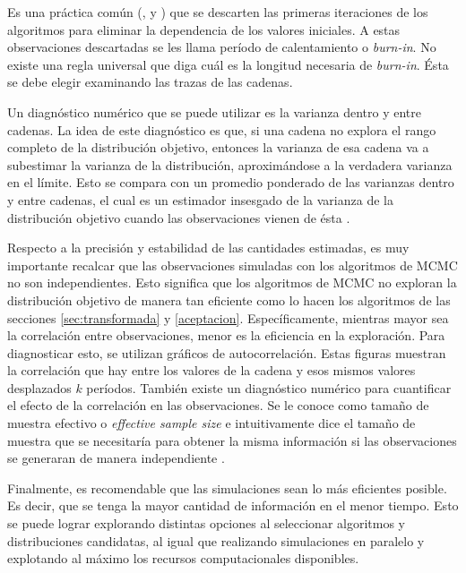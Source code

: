 \documentclass[11pt,a4paper]{article}
\begin{document}
Es una práctica común (\citet{kruschke}, \citet{gelman} y \citet{casella}) que se descarten las primeras iteraciones de los algoritmos para eliminar la dependencia de los valores iniciales. A estas observaciones descartadas se les llama período de calentamiento o \textit{burn-in}. No existe una regla universal que diga cuál es la longitud necesaria de \textit{burn-in}. Ésta se debe elegir examinando las trazas de las cadenas.

Un diagnóstico numérico que se puede utilizar es la varianza dentro y entre cadenas. La idea de este diagnóstico es que, si una cadena no explora el rango completo de la distribución objetivo, entonces la varianza de esa cadena va a subestimar la varianza de la distribución, aproximándose a la verdadera varianza en el límite. Esto se compara con un promedio ponderado de las varianzas dentro y entre cadenas, el cual es un estimador insesgado de la varianza de la distribución objetivo cuando las observaciones vienen de ésta \citep{gelman}.

Respecto a la precisión y estabilidad de las cantidades estimadas, es muy importante recalcar que las observaciones simuladas con los algoritmos de MCMC no son independientes. Esto significa que los algoritmos de MCMC no exploran la distribución objetivo de manera tan eficiente como lo hacen los algoritmos de las secciones \ref{sec:transformada} y \ref{aceptacion}. Específicamente, mientras mayor sea la correlación entre observaciones, menor es la eficiencia en la exploración. Para diagnosticar esto, se utilizan gráficos de autocorrelación. Estas figuras muestran la correlación que hay entre los valores de la cadena y esos mismos valores desplazados $k$ períodos. También existe un diagnóstico numérico para cuantificar el efecto de la correlación en las observaciones. Se le conoce como tamaño de muestra efectivo o \textit{effective sample size} e intuitivamente dice el tamaño de muestra que se necesitaría para obtener la misma información si las observaciones se generaran de manera independiente \citep{kruschke}.

Finalmente, es recomendable que las simulaciones sean lo más eficientes posible. Es decir, que se tenga la mayor cantidad de información en el menor tiempo. Esto se puede lograr explorando distintas opciones al seleccionar algoritmos y distribuciones candidatas, al igual que realizando simulaciones en paralelo y explotando al máximo los recursos computacionales disponibles.
\end{document}
